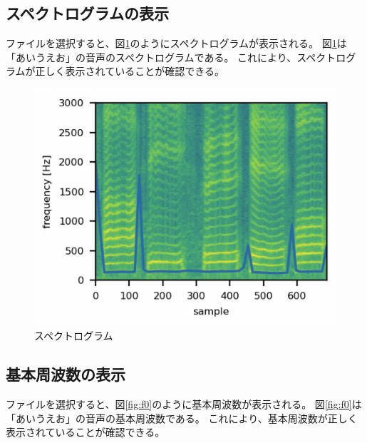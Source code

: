 \documentclass[a4paper,11pt]{jsarticle}
\begin{document}
\subsection{スペクトログラムの表示}

ファイルを選択すると、図\ref{fig:spectrogram}のようにスペクトログラムが表示される。
図\ref{fig:spectrogram}は「あいうえお」の音声のスペクトログラムである。
これにより、スペクトログラムが正しく表示されていることが確認できる。

\begin{figure}[h]
\centering
\includegraphics[keepaspectratio, width=13cm]
{./images/spectrogram.png}
\caption{スペクトログラム}
\label{fig:spectrogram}
\end{figure}

\subsection{基本周波数の表示}

ファイルを選択すると、図\ref{fig:f0}のように基本周波数が表示される。
図\ref{fig:f0}は「あいうえお」の音声の基本周波数である。
これにより、基本周波数が正しく表示されていることが確認できる。
\end{document}
